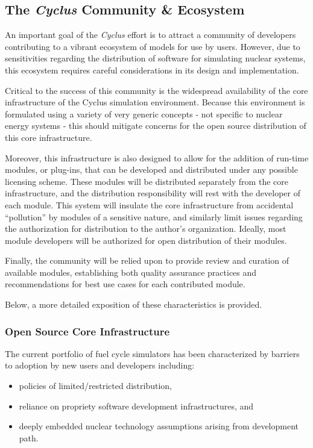 \documentclass[letterpaper,10pt,english]{sphinxmanual}
\begin{document}
\subsection{The \emph{Cyclus} Community \& Ecosystem}
\label{basics/ecosystem::doc}\label{basics/ecosystem:the-cyclus-community-ecosystem}
An important goal of the \emph{Cyclus} effort is to attract a community of
developers contributing to a vibrant ecosystem of models for use by
users.  However, due to sensitivities regarding the distribution of
software for simulating nuclear systems, this ecosystem requires
careful considerations in its design and implementation.

Critical to the success of this community is the widespread
availability of the core infrastructure of the Cyclus simulation
environment.  Because this environment is formulated using a variety
of very generic concepts - not specific to nuclear energy systems -
this should mitigate concerns for the open source distribution of this
core infrastructure.

Moreover, this infrastructure is also designed to allow for the
addition of run-time modules, or plug-ins, that can be developed and
distributed under any possible licensing scheme.  These modules will
be distributed separately from the core infrastructure, and the
distribution responsibility will rest with the developer of each
module.  This system will insulate the core infrastructure from
accidental ``pollution'' by modules of a sensitive nature, and similarly
limit issues regarding the authorization for distribution to the
author's organization.  Ideally, most module developers will be
authorized for open distribution of their modules.

Finally, the community will be relied upon to provide review and
curation of available modules, establishing both quality assurance
practices and recommendations for best use cases for each contributed
module.

Below, a more detailed exposition of these characteristics is
provided.


\subsubsection{Open Source Core Infrastructure}
\label{basics/ecosystem:open-source-core-infrastructure}
The current portfolio of fuel cycle simulators has been characterized
by barriers to adoption by new users and developers including:
\begin{itemize}
\item {} 
policies of limited/restricted distribution,

\item {} 
reliance on propriety software development infrastructures, and

\item {} 
deeply embedded nuclear technology assumptions arising from
development path.

\end{itemize}
\end{document}
